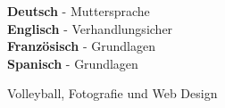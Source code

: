 \documentclass[9pt]{developercv} %
\begin{document}

\begin{minipage}[t]{0.45\textwidth}
	\vspace{-\baselineskip} %


	\textbf{Deutsch} - Muttersprache\\
	\textbf{Englisch} - Verhandlungsicher\\
  \textbf{Französisch} - Grundlagen\\
  \textbf{Spanisch} - Grundlagen
\end{minipage}
\hfill
\begin{minipage}[t]{0.45\textwidth}
	\vspace{-\baselineskip} %


	Volleyball, Fotografie und Web Design
\end{minipage}



\end{document}
